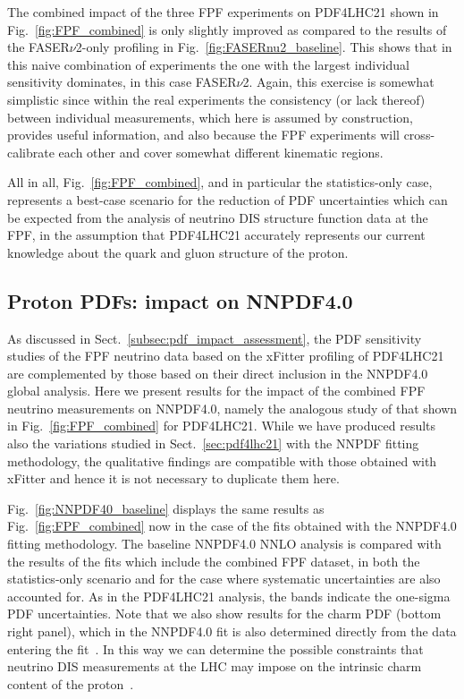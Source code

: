The combined impact of the three FPF experiments on PDF4LHC21 shown in Fig.~\ref{fig:FPF_combined}
is only slightly improved as compared to the results of the FASER$\nu$2-only profiling
in Fig.~\ref{fig:FASERnu2_baseline}.
%
This shows that in this naive combination of experiments the one with the largest individual
sensitivity dominates, in this case FASER$\nu$2.
%
Again, this exercise is somewhat simplistic since within the real experiments the consistency (or lack thereof) between
individual measurements, which here is assumed by construction, provides useful information, and also
because the FPF experiments will cross-calibrate each other and cover somewhat different kinematic regions.

All in all, Fig.~\ref{fig:FPF_combined}, and in particular the statistics-only case, represents
a best-case scenario for the reduction of PDF uncertainties which can be expected from
the analysis of neutrino DIS structure function data at the FPF, in the assumption that PDF4LHC21 accurately represents
our current knowledge about the quark and gluon structure of the proton.

\clearpage


\subsection{Proton PDFs: impact on NNPDF4.0}
\label{sec:nnpdf40}

As discussed in Sect.~\ref{subsec:pdf_impact_assessment}, the PDF sensitivity
studies of the FPF neutrino data based on the {\sc\small xFitter} profiling
of PDF4LHC21 are complemented by those based on their direct inclusion
in the NNPDF4.0 global analysis.
%
Here we present results for the impact of the combined FPF neutrino
measurements on NNPDF4.0, namely the analogous study of that shown
in Fig.~\ref{fig:FPF_combined} for PDF4LHC21.
%
While we have produced results also the variations studied in
Sect.~\ref{sec:pdf4lhc21} with the NNPDF fitting methodology, the qualitative
findings are compatible with those obtained with {\sc\small xFitter} and
hence it is not necessary to duplicate them here.

Fig.~\ref{fig:NNPDF40_baseline} displays the
same results as Fig.~\ref{fig:FPF_combined} now in the case of the
fits obtained with the NNPDF4.0 fitting methodology.
%
The baseline NNPDF4.0 NNLO analysis is compared
with the results of the fits which include the combined FPF dataset,
in both the statistics-only scenario and for the case
where systematic uncertainties are also accounted for.
%
As in the PDF4LHC21 analysis, the bands indicate the one-sigma PDF uncertainties.
%
Note that we also show results for the charm PDF (bottom right panel), which
in the NNPDF4.0 fit is also determined directly from the data entering
the fit~\cite{Ball:2016neh}.
%
In this way we can determine the possible constraints that neutrino
DIS measurements at the LHC may impose on the intrinsic charm
content of the proton~\cite{Ball:2022qks}.

